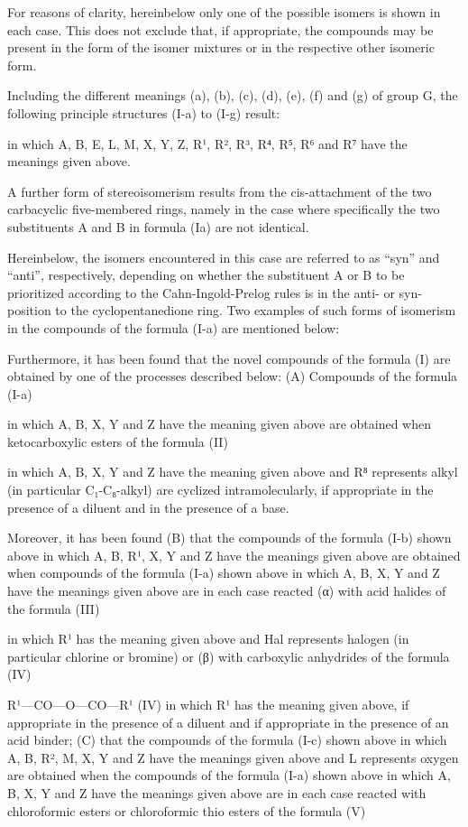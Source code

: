 \documentclass[11pt,a4paper]{article}
\begin{document}
For reasons of clarity, hereinbelow only one of the possible isomers is shown in each case. This does not exclude that, if appropriate, the compounds may be present in the form of the isomer mixtures or in the respective other isomeric form.

Including the different meanings (a), (b), (c), (d), (e), (f) and (g) of group G, the following principle structures (I-a) to (I-g) result:

in which A, B, E, L, M, X, Y, Z, R¹, R², R³, R⁴, R⁵, R⁶ and R⁷ have the meanings given above.

A further form of stereoisomerism results from the cis-attachment of the two carbacyclic five-membered rings, namely in the case where specifically the two substituents A and B in formula (Ia) are not identical.

Hereinbelow, the isomers encountered in this case are referred to as “syn” and “anti”, respectively, depending on whether the substituent A or B to be prioritized according to the Cahn-Ingold-Prelog rules is in the anti- or syn-position to the cyclopentanedione ring. Two examples of such forms of isomerism in the compounds of the formula (I-a) are mentioned below:

Furthermore, it has been found that the novel compounds of the formula (I) are obtained by one of the processes described below: (A) Compounds of the formula (I-a)

in which A, B, X, Y and Z have the meaning given above are obtained when ketocarboxylic esters of the formula (II)

in which A, B, X, Y and Z have the meaning given above and R⁸ represents alkyl (in particular C₁-C₈-alkyl) are cyclized intramolecularly, if appropriate in the presence of a diluent and in the presence of a base.

Moreover, it has been found (B) that the compounds of the formula (I-b) shown above in which A, B, R¹, X, Y and Z have the meanings given above are obtained when compounds of the formula (I-a) shown above in which A, B, X, Y and Z have the meanings given above are in each case reacted (α) with acid halides of the formula (III)

in which R¹ has the meaning given above and Hal represents halogen (in particular chlorine or bromine) or (β) with carboxylic anhydrides of the formula (IV)

R¹—CO—O—CO—R¹ (IV) in which R¹ has the meaning given above, if appropriate in the presence of a diluent and if appropriate in the presence of an acid binder; (C) that the compounds of the formula (I-c) shown above in which A, B, R², M, X, Y and Z have the meanings given above and L represents oxygen are obtained when the compounds of the formula (I-a) shown above in which A, B, X, Y and Z have the meanings given above are in each case reacted with chloroformic esters or chloroformic thio esters of the formula (V)
\end{document}
